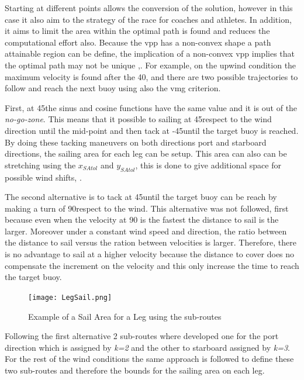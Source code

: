 Starting at different points allows the conversion of the solution, however in this case it also aim to the strategy of the race for coaches and athletes. In addition, it aims to limit the area within the optimal path is found and reduces the computational effort also. Because the \acrshort{vpp} has a non-convex shape a path attainable region can be define, the implication of a non-convex \acrshort{vpp} implies that the optimal path may not be unique \cite{dolinskaya2012time},\cite{dolinskaya2013fastest}.  For example, on the upwind condition the maximum velocity is found after the 40\degree, and there are two possible trajectories to follow and reach the next buoy using also the \acrshort{vmg} criterion. \par 
First, at 45\degree the sinus and cosine functions have the same value and it is out of the \textit{no-go-zone}. This means that it possible to sailing at 45\degree respect to the wind direction until the mid-point %
and then tack at -45\degree until the target buoy is reached. By doing these tacking maneuvers on both directions port and starboard directions, the sailing area for each leg can be setup. This area can also can be stretching using the $x_{SAtol}$ and $y_{SAtol}$, this is done to give additional space for possible wind shifts, \cite{xing2012path}. \par \noindent
The second alternative is to tack at 45\degree until the target buoy can be reach by making a turn of 90\degree respect to the wind. This alternative was not followed, first because even when the velocity at 90 \degree is the fastest the distance to sail is the larger. Moreover under a constant wind speed and  direction, the ratio between the distance to sail versus the ration between velocities is larger. Therefore, there is no advantage to sail at a higher velocity because the distance to cover does no compensate the increment on the velocity and this only increase the time to reach the target buoy. \par 
\begin{figure}[hbt!]
    \centering
    \texttt{[image: LegSail.png]}
    \caption{Example of a Sail Area for a Leg using the sub-routes}
    \label{fig:LegSailArea}
\end{figure}
Following the first alternative 2 sub-routes where developed one for the port direction which is assigned by \textit{k=2} and the other to starboard assigned by \textit{k=3}. For the rest of the wind conditions the same approach is followed to define these two sub-routes and therefore the bounds for the sailing area on each leg.  \par
